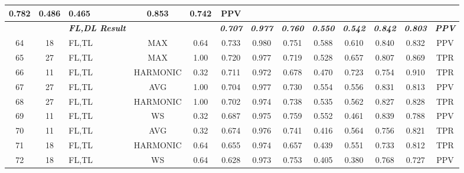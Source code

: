 \begin{table}[H]
{\begin{tabular}{cc|l|cc|c|c|c|c|c|c|c|c|}
    0.782 &
    0.486 &
    0.465 &
    0.853 &
    0.742 &
    PPV \\ \hline
   &
    \textit{\textbf{}} &
    \textit{\textbf{FL,DL Result}} &
     &
     &
    \textit{\textbf{0.707}} &
    \textit{\textbf{0.977}} &
    \textit{\textbf{0.760}} &
    \textit{\textbf{0.550}} &
    \textit{\textbf{0.542}} &
    \textit{\textbf{0.842}} &
    \textit{\textbf{0.803}} &
    \textit{\textbf{PPV}} \\ \hline
  \multicolumn{1}{|c|}{64} &
    18 &
    FL,TL &
    \multicolumn{1}{c|}{MAX} &
    0.64 &
    0.733 &
    0.980 &
    0.751 &
    0.588 &
    0.610 &
    0.840 &
    0.832 &
    PPV \\ \hline
  \multicolumn{1}{|c|}{65} &
    27 &
    FL,TL &
    \multicolumn{1}{c|}{MAX} &
    1.00 &
    0.720 &
    0.977 &
    0.719 &
    0.528 &
    0.657 &
    0.807 &
    0.869 &
    TPR \\ \hline
  \multicolumn{1}{|c|}{66} &
    11 &
    FL,TL &
    \multicolumn{1}{c|}{HARMONIC} &
    0.32 &
    0.711 &
    0.972 &
    0.678 &
    0.470 &
    0.723 &
    0.754 &
    0.910 &
    TPR \\ \hline
  \multicolumn{1}{|c|}{67} &
    27 &
    FL,TL &
    \multicolumn{1}{c|}{AVG} &
    1.00 &
    0.704 &
    0.977 &
    0.730 &
    0.554 &
    0.556 &
    0.831 &
    0.813 &
    PPV \\ \hline
  \multicolumn{1}{|c|}{68} &
    27 &
    FL,TL &
    \multicolumn{1}{c|}{HARMONIC} &
    1.00 &
    0.702 &
    0.974 &
    0.738 &
    0.535 &
    0.562 &
    0.827 &
    0.828 &
    TPR \\ \hline
  \multicolumn{1}{|c|}{69} &
    11 &
    FL,TL &
    \multicolumn{1}{c|}{WS} &
    0.32 &
    0.687 &
    0.975 &
    0.759 &
    0.552 &
    0.461 &
    0.839 &
    0.788 &
    PPV \\ \hline
  \multicolumn{1}{|c|}{70} &
    11 &
    FL,TL &
    \multicolumn{1}{c|}{AVG} &
    0.32 &
    0.674 &
    0.976 &
    0.741 &
    0.416 &
    0.564 &
    0.756 &
    0.821 &
    TPR \\ \hline
  \multicolumn{1}{|c|}{71} &
    18 &
    FL,TL &
    \multicolumn{1}{c|}{HARMONIC} &
    0.64 &
    0.655 &
    0.974 &
    0.657 &
    0.439 &
    0.551 &
    0.733 &
    0.812 &
    TPR \\ \hline
  \multicolumn{1}{|c|}{72} &
    18 &
    FL,TL &
    \multicolumn{1}{c|}{WS} &
    0.64 &
    0.628 &
    0.973 &
    0.753 &
    0.405 &
    0.380 &
    0.768 &
    0.727 &
    PPV \\ \hline

\end{tabular}}
\end{table}
